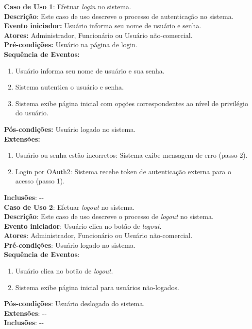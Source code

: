 \documentclass[]{politex}
\begin{document}
\noindent \textbf{Caso de Uso 1}: Efetuar \textit{login} no sistema. \\
\textbf{Descrição}: Este caso de uso descreve o processo de autenticação no sistema. \\
\textbf{Evento iniciador:} Usuário informa seu nome de usuário e senha. \\
\textbf{Atores:} Administrador, Funcionário ou Usuário não-comercial. \\
\textbf{Pré-condições:} Usuário na página de login. \\
\textbf{Sequência de Eventos:}
\begin{enumerate}
\item Usuário informa seu nome de usuário e sua senha.
\item Sistema autentica o usuário e senha.
\item Sistema exibe página inicial com opções correspondentes ao nível de privilégio do usuário.
\end{enumerate}
\textbf{Pós-condições:} Usuário logado no sistema. \\
\textbf{Extensões:}
\begin{enumerate}
\item Usuário ou senha estão incorretos: Sistema exibe mensagem de erro (passo 2).
\item Login por OAuth2: Sistema recebe token de autenticação externa para o acesso (passo 1).
\end{enumerate}
\textbf{Inclusões}: -{}- \\

\noindent \textbf{Caso de Uso 2}: Efetuar \textit{logout} no sistema. \\
\textbf{Descrição}: Este caso de uso descreve o processo de \textit{logout} no sistema. \\
\textbf{Evento iniciador}: Usuário clica no botão de \textit{logout}. \\
\textbf{Atores}: Administrador, Funcionário ou Usuário não-comercial. \\
\textbf{Pré-condições}: Usuário logado no sistema. \\
\textbf{Sequência de Eventos}:
\begin{enumerate}
\item Usuário clica no botão de \textit{logout}.
\item Sistema exibe página inicial para usuários não-logados.
\end{enumerate}
\textbf{Pós-condições}: Usuário deslogado do sistema. \\
\textbf{Extensões}: -{}- \\
\textbf{Inclusões}: -{}- \\
\end{document}
